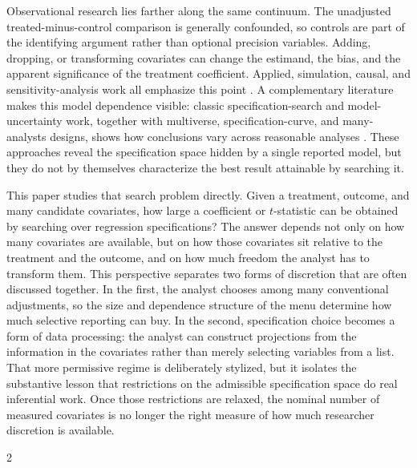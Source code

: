 \documentclass[10pt,english]{article}
\begin{document}
Observational research lies farther along the same continuum. The unadjusted treated-minus-control comparison is generally confounded, so controls are part of the identifying argument rather than optional precision variables. Adding, dropping, or transforming covariates can change the estimand, the bias, and the apparent significance of the treatment coefficient. Applied, simulation, causal, and sensitivity-analysis work all emphasize this point \citep{lenz2021achieving,sturman2022uncontrolled,yu2024misstatements,oster2019unobservable,cinelliHazlett2020sensitivity,cinelliForneyPearl2022crash,cinelliHazlett2025iv,tsao2025minimum}. A complementary literature makes this model dependence visible: classic specification-search and model-uncertainty work, together with multiverse, specification-curve, and many-analysts designs, shows how conclusions vary across reasonable analyses \citep{leamer1983con,salaimartin1997twoMillion,young2009modelUncertainty,youngModelUncertaintyRobustness2017,steegenIncreasingTransparencyMultiverse2016,simonsohnSpecificationCurveDescriptive2019,silberzahn2018many,breznau2022hidden,rohrer2026multiverse}. These approaches reveal the specification space hidden by a single reported model, but they do not by themselves characterize the best result attainable by searching it.

This paper studies that search problem directly. Given a treatment, outcome, and many candidate covariates, how large a coefficient or $t$-statistic can be obtained by searching over regression specifications? The answer depends not only on how many covariates are available, but on how those covariates sit relative to the treatment and the outcome, and on how much freedom the analyst has to transform them. This perspective separates two forms of discretion that are often discussed together. In the first, the analyst chooses among many conventional adjustments, so the size and dependence structure of the menu determine how much selective reporting can buy. In the second, specification choice becomes a form of data processing: the analyst can construct projections from the information in the covariates rather than merely selecting variables from a list. That more permissive regime is deliberately stylized, but it isolates the substantive lesson that restrictions on the admissible specification space do real inferential work. Once those restrictions are relaxed, the nominal number of measured covariates is no longer the right measure of how much researcher discretion is available.

{\scriptsize
\begin{multicols}{2}

\end{multicols}
}
\end{document}
